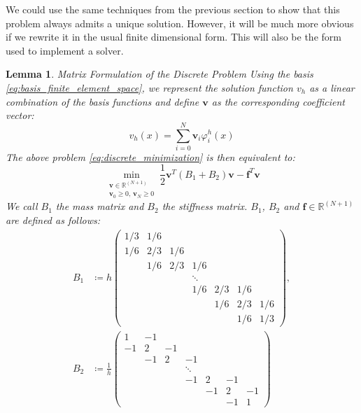 \documentclass[headsepline,footsepline,footinclude=false,oneside,fontsize=11pt,paper=a4,listof=totoc,bibliography=totoc]{scrbook} %
\newtheorem{lemma}{Lemma}
\begin{document}
We could use the same techniques from the previous section to show that this problem always admits a unique solution. However, it will be much more obvious if we rewrite it in the usual finite dimensional form. This will also be the form used to implement a solver.

\begin{lemma} Matrix Formulation of the Discrete Problem \newline
	Using the basis \eqref{eq:basis_finite_element_space}, we represent the solution function $v_h$ as a linear combination of the basis functions and define $\mathbf{v}$ as the corresponding coefficient vector:
	\begin{equation} \label{eq:basis_representation_v_h}
	v_h(x) = \sum_{i=0}^{N} \mathbf{v}_i \varphi_i^h(x)
	\end{equation}
		The above problem \eqref{eq:discrete_minimization} is then equivalent to:
		\begin{equation} \label{eq:matrix_formulation}
		\min_{\substack{\mathbf{v} \in \mathbb{R}^{(N+1)}\\ \mathbf{v}_{0} \geq 0,\, \mathbf{v}_N \geq 0}} \frac{1}{2} \mathbf{v}^T (B_1 + B_2) \mathbf{v} - \mathbf{f}^T  \mathbf{v}
		\end{equation}
		We call $B_1$ the \emph{mass matrix} and $B_2$ the \emph{stiffness matrix}. $B_1$, $B_2$ and $\mathbf{f} \in \mathbb{R}^{(N+1)}$ are defined as follows:
		\begin{align*}
		B_1 &\coloneqq 			h	\begin{pmatrix}
		1/3& 1/6 & & & & & \\
		1/6& 2/3& 1/6 & & & & \\
		& 1/6& 2/3& 1/6 & & & \\
		& & & \ddots & & & \\
		& & & 1/6& 2/3& 1/6 & \\
		& & & & 1/6& 2/3& 1/6 \\
		& & & & & 1/6& 1/3
		\end{pmatrix}, \\
		 B_2 &\coloneqq \frac{1}{h} 			\begin{pmatrix}
		1& -1 & & & & & \\
		-1& 2& -1 & & & & \\
		& -1& 2& -1 & & & \\
		& & & \ddots & & & \\
		& & & -1& 2& -1 & \\
		& & & & -1& 2& -1 \\
		& & & & & -1& 1
		\end{pmatrix} \\

\end{align*}
\end{lemma}
\end{document}
